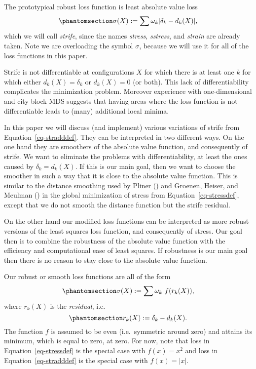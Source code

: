 \documentclass[
  12pt,
  letterpaper,
  DIV=11,
  numbers=noendperiod]{scrartcl}
\theoremstyle{definition}
\theoremstyle{plain}
\theoremstyle{plain}
\theoremstyle{plain}
\theoremstyle{definition}
\theoremstyle{remark}
\begin{document}
The prototypical robust loss function is least absolute value loss
\begin{equation}\phantomsection\label{eq-stradddef}{
\sigma(X):=\sum \omega_k|\delta_k-d_k(X)|,
}\end{equation} which we will call \emph{strife}, since the names
\emph{stress}, \emph{sstress}, and \emph{strain} are already taken. Note
we are overloading the symbol \(\sigma\), because we will use it for all
of the loss functions in this paper.

Strife is not differentiable at configurations \(X\) for which there is
at least one \(k\) for which either \(d_k(X)=\delta_k\) or \(d_k(X)=0\)
(or both). This lack of differentiability complicates the minimization
problem. Moreover experience with one-dimensional and city block MDS
suggests that having areas where the loss function is not differentiable
leads to (many) additional local minima.

In this paper we will discuss (and implement) various variations of
strife from Equation~\ref{eq-stradddef}. They can be interpreted in two
different ways. On the one hand they are smoothers of the absolute value
function, and consequently of strife. We want to eliminate the problems
with differentiability, at least the ones caused by \(\delta_k=d_k(X)\).
If this is our main goal, then we want to choose the smoother in such a
way that it is close to the absolute value function. This is similar to
the distance smoothing used by Pliner ()
and Groenen, Heiser, and Meulman
() in the global
minimization of stress from Equation~\ref{eq-stressdef}, except that we
do not smooth the distance function but the strife residual.

On the other hand our modified loss functions can be interpreted as more
robust versions of the least squares loss function, and consequently of
stress. Our goal then is to combine the robustness of the absolute value
function with the efficiency and computational ease of least squares. If
robustness is our main goal then there is no reason to stay close to the
absolute value function.

Our robust or smooth loss functions are all of the form
\begin{equation}\phantomsection\label{eq-strifedef}{
\sigma(X):=\sum\omega_k\ f(r_k(X)),
}\end{equation} where \(r_k(X)\) is the \emph{residual}, i.e.
\begin{equation}\phantomsection\label{eq-resdef}{
r_k(X):=\delta_k-d_k(X).
}\end{equation} The function \(f\) is assumed to be even (i.e.~symmetric
around zero) and attains its minimum, which is equal to zero, at zero.
For now, note that loss in Equation~\ref{eq-stressdef} is the special
case with \(f(x)=x^2\) and loss in Equation~\ref{eq-stradddef} is the
special case with \(f(x)=|x|\).
\end{document}
